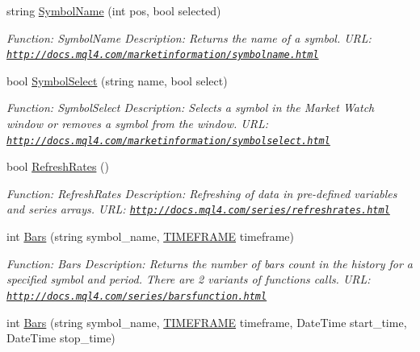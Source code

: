 \begin{DoxyCompactItemize}
string \hyperlink{class_m_q_l4_c_sharp_1_1_base_1_1_m_q_l_base_a4aba4636cd19dbca12ace3c29202b740}{Symbol\+Name} (int pos, bool selected)
\begin{DoxyCompactList}\small\item\em Function\+: Symbol\+Name Description\+: Returns the name of a symbol. U\+RL\+: \href{http://docs.mql4.com/marketinformation/symbolname.html}{\tt http\+://docs.\+mql4.\+com/marketinformation/symbolname.\+html} \end{DoxyCompactList}\item 
bool \hyperlink{class_m_q_l4_c_sharp_1_1_base_1_1_m_q_l_base_aa0035fc50f74473ee1a3d1fb7135839c}{Symbol\+Select} (string name, bool select)
\begin{DoxyCompactList}\small\item\em Function\+: Symbol\+Select Description\+: Selects a symbol in the Market Watch window or removes a symbol from the window. U\+RL\+: \href{http://docs.mql4.com/marketinformation/symbolselect.html}{\tt http\+://docs.\+mql4.\+com/marketinformation/symbolselect.\+html} \end{DoxyCompactList}\item 
bool \hyperlink{class_m_q_l4_c_sharp_1_1_base_1_1_m_q_l_base_a5b75c924fcfb8d7d02e01d56bcee605e}{Refresh\+Rates} ()
\begin{DoxyCompactList}\small\item\em Function\+: Refresh\+Rates Description\+: Refreshing of data in pre-\/defined variables and series arrays. U\+RL\+: \href{http://docs.mql4.com/series/refreshrates.html}{\tt http\+://docs.\+mql4.\+com/series/refreshrates.\+html} \end{DoxyCompactList}\item 
int \hyperlink{class_m_q_l4_c_sharp_1_1_base_1_1_m_q_l_base_a4fa8c043780e6dede461a86fa26cc69b}{Bars} (string symbol\+\_\+name, \hyperlink{namespace_m_q_l4_c_sharp_1_1_base_1_1_enums_a838810aaa87c63c12737408dba8c0b35}{T\+I\+M\+E\+F\+R\+A\+ME} timeframe)
\begin{DoxyCompactList}\small\item\em Function\+: Bars Description\+: Returns the number of bars count in the history for a specified symbol and period. There are 2 variants of functions calls. U\+RL\+: \href{http://docs.mql4.com/series/barsfunction.html}{\tt http\+://docs.\+mql4.\+com/series/barsfunction.\+html} \end{DoxyCompactList}\item 
int \hyperlink{class_m_q_l4_c_sharp_1_1_base_1_1_m_q_l_base_aa71412625d3c277daa18ec2999acb7c8}{Bars} (string symbol\+\_\+name, \hyperlink{namespace_m_q_l4_c_sharp_1_1_base_1_1_enums_a838810aaa87c63c12737408dba8c0b35}{T\+I\+M\+E\+F\+R\+A\+ME} timeframe, Date\+Time start\+\_\+time, Date\+Time stop\+\_\+time)

\end{DoxyCompactItemize}
